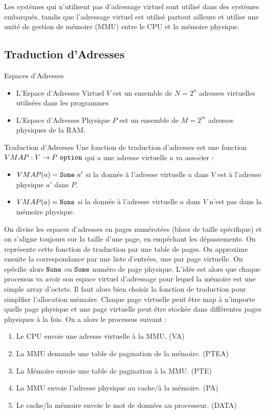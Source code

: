 \documentclass{cours}
\begin{document}
Les systèmes qui n'utilisent pas d'adressage virtuel sont utilisé dans des systèmes embarqués, tandis que l'adressage virtuel est utilisé partout ailleurs et utilise une unité de gestion de mémoire (MMU) entre le CPU et la mémoire physique. 

\subsection{Traduction d'Adresses}
\begin{définition}{Espaces d'Adresses}{}
    \begin{itemize}
        \item L'Espace d'Adresses Virtuel $V$ est un ensemble de $N = 2^{n}$ adresses virtuelles utilisées dans les programmes
        \item L'Espace d'Adresses Physique $P$ est un ensemble de $M = 2^{m}$ adresses physiques de la RAM.
    \end{itemize}
\end{définition}
\begin{définition}{Traduction d'Adresses}{}
    Une fonction de traduction d'adresses est une fonction $VMAP : V \to P\ {\tt option}$ qui a une adresse virtuelle $a$ va associer : 
    \begin{itemize}
        \item $VMAP(a) = {\tt Some }\ a'$ si la donnée à l'adresse virtuelle $a$ dans $V$ est à l'adresse physique $a'$ dans $P$.
        \item $VMAP(a) = {\tt None}$ si la donnée à l'adresse virtuelle $a$ dans $V$ n'est pas dans la mémoire physique. 
    \end{itemize}
\end{définition}

On divise les espaces d'adresses en pages numérotées (blocs de taille spécifique) et on s'aligne toujours sur la taille d'une page, en empêchant les dépassements.
On représente cette fonction de traduction par une table de pages. On approxime ensuite la correspondance par une liste d'entrées, une par page virtuelle. On spécifie alors $\tt None$ ou $\tt Some$ numéro de page physique. 
L'idée est alors que chaque processus va avoir son espace virtuel d'adressage pour lequel la mémoire est une simple array d'octets. Il faut alors bien choisir la fonction de traduction pour simplfier l'allocation mémoire. 
Chaque page virtuelle peut être map à n'importe quelle page physique et une page virtuelle peut être stockée dans différentes pages physiques à la fois.
On a alors le processus suivant : 
\begin{enumerate}
    \item Le CPU envoie une adresse virtuelle à la MMU. (VA)
    \item La MMU demande une table de pagination de la mémoire. (PTEA)
    \item La Mémoire envoie une table de pagination à la MMU. (PTE)
    \item La MMU envoie l'adresse physique au cache/à la mémoire. (PA)
    \item Le cache/la mémoire envoie le mot de données au processeur. (DATA)
\end{enumerate}
\end{document}
